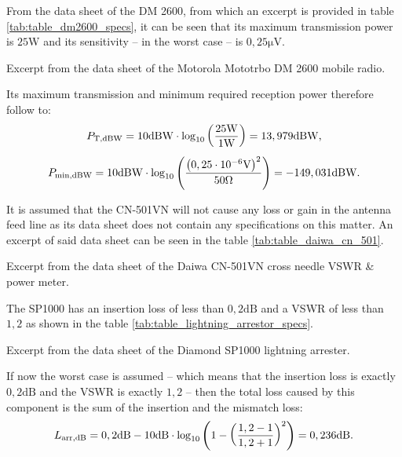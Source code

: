 From the data sheet of the DM 2600, from which an excerpt is provided in table \ref{tab:table_dm2600_specs}, it can be seen that its maximum transmission power is $25\mathrm{W}$ and its sensitivity -- in the worst case -- is $0,25\mathrm{\mu V}$.
\begin{table}[h!]
	\centering
	
	\caption{Excerpt from the data sheet of the Motorola Mototrbo DM 2600 mobile radio. \cite{DM2600:2013}}
	\label{tab:table_dm2600_specs}
\end{table}
Its maximum transmission and minimum required reception power therefore follow to:
\begin{equation} \label{eq:power_BSt_tx}
	\centering
	P_\mathrm{T,dBW} =  10\mathrm{dBW} \cdot \log_{10} \left( \dfrac{25\mathrm{W}}{1\mathrm{W}} \right) = 13,979\mathrm{dBW}\text{,}
\end{equation}
\begin{equation} \label{eq:power_BSt_min}
	\centering
	P_\mathrm{min,dBW} = 10\mathrm{dBW} \cdot \log_{10} \left( \dfrac{\left(0,25\cdot10^{-6}\mathrm{V}\right)^2}{50\Omega} \right) = -149,031\mathrm{dBW}\text{.}
\end{equation}

It is assumed that the CN-501VN will not cause any loss or gain in the antenna feed line as its data sheet does not contain any specifications on this matter. An excerpt of said data sheet can be seen in the table \ref{tab:table_daiwa_cn_501}.
\begin{table}[h!]
	\centering
	
	\caption{Excerpt from the data sheet of the Daiwa CN-501VN cross needle VSWR \& power meter.\cite{Daiwa-industry-co.:2016}}
	\label{tab:table_daiwa_cn_501}
\end{table}

The SP1000 has an insertion loss of less than $0,2\mathrm{dB}$ and a VSWR of less than $1,2$ as shown in the table \ref{tab:table_lightning_arrestor_specs}.
\begin{table}[h!]
	\centering
	
	\caption{Excerpt from the data sheet of the Diamond SP1000 lightning arrester. \cite{SP1000:2020}}
	\label{tab:table_lightning_arrestor_specs}
\end{table}
If now the worst case is assumed -- which means that the insertion loss is exactly $0,2\mathrm{dB}$ and the VSWR is exactly $1,2$ -- then the total loss caused by this component is the sum of the insertion and the mismatch loss:
\begin{equation} \label{eq:losses_BSt_arr}
	\centering
	L_\mathrm{arr,dB} = 0,2\mathrm{dB} - 10\mathrm{dB} \cdot \log_{10} \left(1 - \left(\dfrac{1,2 - 1}{1,2 + 1}\right)^2\right) = 0,236\mathrm{dB}\text{.}
\end{equation}

